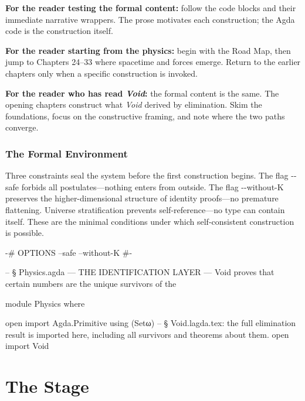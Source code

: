 \documentclass[11pt,a4paper]{book}
\newcommand{\AgdaFlag}[1]{\texttt{-{}-#1}}
\def\texttt#1{#1}%
\begin{document}
\textbf{For the reader testing the formal content:} follow the code blocks and their immediate narrative wrappers. The prose motivates each construction; the Agda code is the construction itself.

\textbf{For the reader starting from the physics:} begin with the Road Map, then jump to Chapters 24--33 where spacetime and forces emerge. Return to the earlier chapters only when a specific construction is invoked.

\textbf{For the reader who has read \textit{Void}:} the formal content is the same. The opening chapters construct what \textit{Void} derived by elimination. Skim the foundations, focus on the constructive framing, and note where the two paths converge.

\section*{The Formal Environment}

Three constraints seal the system before the first construction begins. The flag \AgdaFlag{safe} forbids all postulates---nothing enters from outside. The flag \AgdaFlag{without-K} preserves the higher-dimensional structure of identity proofs---no premature flattening. Universe stratification prevents self-reference---no type can contain itself. These are the minimal conditions under which self-consistent construction is possible.

\begin{code}
{-# OPTIONS --safe --without-K #-}

-- § Physics.agda — THE IDENTIFICATION LAYER — Void proves that certain numbers are the unique survivors of the

module Physics where

open import Agda.Primitive using (Setω)
-- § Void.lagda.tex: the full elimination result is imported here, including all survivors and theorems about them.
open import Void
\end{code}

\mainmatter

\part{The Stage}

\end{document}

